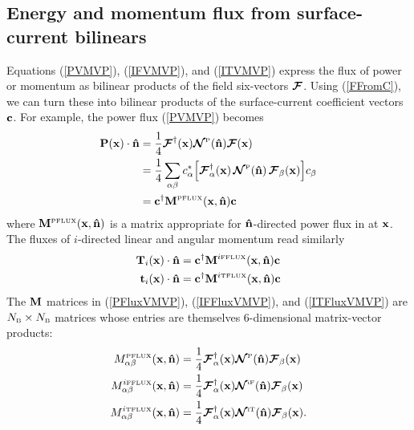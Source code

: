 \documentclass[letterpaper]{article}
\newcommand{\IFFlux}{^{i\text{\tiny FFLUX}}}
\newcommand{\ITFlux}{^{i\text{\tiny TFLUX}}}
\begin{document}
\subsection*{Energy and momentum flux from surface-current bilinears}

Equations (\ref{PVMVP}), (\ref{IFVMVP}), and (\ref{ITVMVP}) express
the flux of power or momentum as bilinear products of the field
six-vectors $\boldsymbol{\mathcal{F}}$. Using (\ref{FFromC}), we can turn these into
bilinear products of the surface-current coefficient vectors
$\mathbf{c}$. For example, the power flux (\ref{PVMVP}) becomes 
\begin{align}
 \mathbf{P}(\mathbf{x}) \cdot \mathbf{\hat n}
&=\frac{1}{4}\boldsymbol{\mathcal{F}}^\dagger(\mathbf{x}) \boldsymbol{\mathcal{N}}^{\hbox{\tiny{P}}}(\mathbf{\hat n}) \boldsymbol{\mathcal{F}}(\mathbf{x})
\nonumber \\
&=\frac{1}{4}\sum_{\alpha \beta} 
  c_\alpha^* 
  \Big[ \boldsymbol{\mathcal{F}}^\dagger_\alpha(\mathbf{x})
        \,
        \boldsymbol{\mathcal{N}}^{\hbox{\tiny{P}}}(\mathbf{\hat n})
        \,
        \boldsymbol{\mathcal{F}}_\beta(\mathbf{x})
  \Big]
  c_\beta 
\nonumber \\
&= \mathbf{c}^\dagger \mathbf{M}^{\hbox{\tiny{PFLUX}}}(\mathbf{x}, \mathbf{\hat n}) \mathbf{c} 
\label{PFluxVMVP}
\end{align}
where $\mathbf{M}^{\hbox{\tiny{PFLUX}}}(\mathbf{x},\mathbf{\hat n})$ is a matrix 
appropriate for $\mathbf{\hat n}$-directed power flux in at $\mathbf{x}$.
The fluxes of $i$-directed linear and angular momentum read
similarly
\begin{align}
\vb T_i(\vb x) \cdot \vbhat{n}
&= \vb c^\dagger \vb M\IFFlux(\vb x, \vbhat{n}) \vb c 
\label{IFFluxVMVP}
\\
\vb t_i(\vb x) \cdot \vbhat{n}
&= \vb c^\dagger \vb M\ITFlux(\vb x, \vbhat{n}) \vb c 
\label{ITFluxVMVP}
\end{align}
The $\mathbf{M}$ matrices in (\ref{PFluxVMVP}), (\ref{IFFluxVMVP}), and 
(\ref{ITFluxVMVP}) are $N_{\hbox{\tiny{B}}}\times N_{\hbox{\tiny{B}}}$ matrices
whose entries are themselves 6-dimensional matrix-vector products:
\begin{align*}
M_{\alpha\beta}\supt{PFLUX}(\vb x, \vbhat{n}) 
 &= \frac{1}{4} 
    \bmc F^\dagger_\alpha(\vb x) 
    \bmc N\supt{P}(\vbhat{n})
    \bmc F_\beta(\vb x) 
\\
M_{\alpha\beta}\IFFlux(\vb x, \vbhat{n})
 &= \frac{1}{4} 
    \bmc F^\dagger_\alpha(\vb x) 
    \bmc N\supt{iF}(\vbhat{n})
    \bmc F_\beta(\vb x) 
\\
M_{\alpha\beta}\ITFlux(\vb x, \vbhat{n})
 &= \frac{1}{4} 
    \bmc F^\dagger_\alpha(\vb x) 
    \bmc N\supt{iT}(\vbhat{n})
    \bmc F_\beta(\vb x).
\end{align*}
\end{document}
